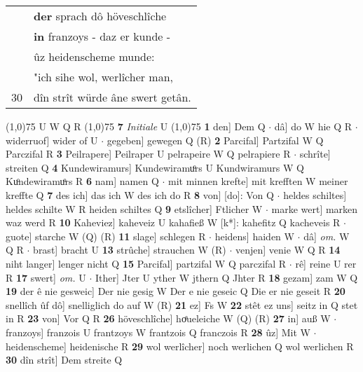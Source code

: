 \documentclass[8pt,a4paper,notitlepage]{article}
\begin{document}
\begin{table}[ht]
\begin{minipage}[t]{0.5\linewidth}
\begin{tabular}{rl}
 & \textbf{der} sprach dô höveschlîche\\ 
 & \textbf{in} franzoys - daz er kunde -\\ 
 & ûz heidenscheme munde:\\ 
 & "ich sihe wol, werlîcher man,\\ 
30 & dîn strît würde âne swert getân.\\ 
\end{tabular}
\scriptsize
\line(1,0){75} \newline
U W Q R \newline
\line(1,0){75} \newline
\textbf{7} \textit{Initiale} U  \newline
\line(1,0){75} \newline
\textbf{1} den] Dem Q  $\cdot$ dâ] do W hie Q R  $\cdot$ widerruof] wider of U  $\cdot$ gegeben] gewegen Q (R) \textbf{2} Parcifal] Partzifal W Q Parczifal R \textbf{3} Peilrapere] Peilraper U pelrapeire W Q pelrapiere R  $\cdot$ schrîte] streiten Q \textbf{4} Kundewiramurs] Kundewiramuͦrs U Kundwiramurs W Q Kuͦndewiramuͦrs R \textbf{6} nam] namen Q  $\cdot$ mit minnen krefte] mit krefften W meiner kreffte Q \textbf{7} des ich] das ich W des ich do R \textbf{8} von] [do]: Von Q  $\cdot$ heldes schiltes] heldes schilte W R heiden schiltes Q \textbf{9} etslîcher] Ftlicher W  $\cdot$ marke wert] marken waz werd R \textbf{10} Kaheviez] kaheveiz U kahafieß W [k*]: kahefitz Q kacheveis R  $\cdot$ guote] starche W (Q) (R) \textbf{11} slage] schlegen R  $\cdot$ heidens] haiden W  $\cdot$ dâ] \textit{om.} W Q R  $\cdot$ brast] bracht U \textbf{13} strûche] strauchen W (R)  $\cdot$ venjen] venie W Q R \textbf{14} niht langer] lenger nicht Q \textbf{15} Parcifal] partzifal W Q parczifal R  $\cdot$ rê] reine U rer R \textbf{17} swert] \textit{om.} U  $\cdot$ Ither] Jter U yther W jthern Q Jhter R \textbf{18} gezam] zam W Q \textbf{19} der ê nie gesweic] Der nie gesig W Der e nie geseic Q Die er nie geseit R \textbf{20} snellîch ûf dô] snelliglich do auf W (R) \textbf{21} ez] Fs W \textbf{22} stêt ez uns] seitz in Q stet in R \textbf{23} von] Vor Q R \textbf{26} höveschlîche] hoͤueleiche W (Q) (R) \textbf{27} in] auß W  $\cdot$ franzoys] franzois U frantzoys W frantzois Q franczois R \textbf{28} ûz] Mit W  $\cdot$ heidenscheme] heidenische R \textbf{29} wol werlîcher] noch werlichen Q wol werlichen R \textbf{30} dîn strît] Dem streite Q \newline
\end{minipage}
\end{table}
\end{document}
